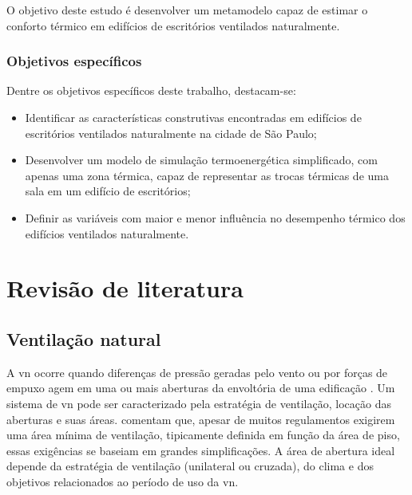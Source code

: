 \documentclass[brazil,hardcopy,openany]{ufscthesis} %
\begin{document}
O objetivo deste estudo é desenvolver um metamodelo capaz de estimar o conforto térmico em edifícios de escritórios ventilados naturalmente.

\subsection{Objetivos específicos}

Dentre os objetivos específicos deste trabalho, destacam-se:

\begin{itemize}
	\item Identificar as características construtivas encontradas em edifícios de escritórios ventilados naturalmente na cidade de São Paulo;
	\item Desenvolver um modelo de simulação termoenergética simplificado, com apenas uma zona térmica, capaz de representar as trocas térmicas de uma sala em um edifício de escritórios;
	\item Definir as variáveis com maior e menor influência no desempenho térmico dos edifícios ventilados naturalmente.
\end{itemize}

\chapter{Revisão de literatura}

\section{Ventilação natural}

A \acrfull{vn} ocorre quando diferenças de pressão geradas pelo vento ou por forças de empuxo agem em uma ou mais aberturas da envoltória de uma edificação \cite{CarrilhodaGraca2016}. Um sistema de \acrshort{vn} pode ser caracterizado pela estratégia de ventilação, locação das aberturas e suas áreas.   comentam que, apesar de muitos regulamentos exigirem uma área mínima de ventilação, tipicamente definida em função da área de piso, essas exigências se baseiam em grandes simplificações. A área de abertura ideal depende da estratégia de ventilação (unilateral ou cruzada), do clima e dos objetivos relacionados ao período de uso da \acrshort{vn}.
\end{document}
